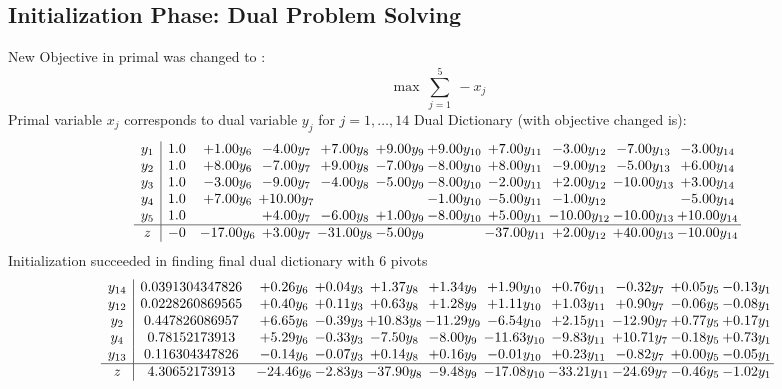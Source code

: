 \documentclass[9pt]{article}
\begin{document}
\subsection{Initialization Phase: Dual Problem Solving}
New Objective in primal was changed to : \[ \max\ \sum_{j=1}^{5}\ - x_j \] 
Primal variable $x_j$ corresponds to dual variable $y_j$ for $j = 1,\ldots,14$
Dual Dictionary (with objective changed is): 
\[\begin{array}{c| c c@{\hskip 2pt} c@{\hskip 2pt} c@{\hskip 2pt} c@{\hskip 2pt} c@{\hskip 2pt} c@{\hskip 2pt} c@{\hskip 2pt} c@{\hskip 2pt} c@{\hskip 2pt} }
 y_{1}   &  1.0 & +  1.00 y_{6} & -4.00 y_{7} & +  7.00 y_{8} & +  9.00 y_{9} & +  9.00 y_{10} & +  7.00 y_{11} & -3.00 y_{12} & -7.00 y_{13} & -3.00 y_{14}\\
 y_{2}   &  1.0 & +  8.00 y_{6} & -7.00 y_{7} & +  9.00 y_{8} & -7.00 y_{9} & -8.00 y_{10} & +  8.00 y_{11} & -9.00 y_{12} & -5.00 y_{13} & +  6.00 y_{14}\\
 y_{3}   &  1.0 & -3.00 y_{6} & -9.00 y_{7} & -4.00 y_{8} & -5.00 y_{9} & -8.00 y_{10} & -2.00 y_{11} & +  2.00 y_{12} & -10.00 y_{13} & +  3.00 y_{14}\\
 y_{4}   &  1.0 & +  7.00 y_{6} & + 10.00 y_{7} &    &   & -1.00 y_{10} & -5.00 y_{11} & -1.00 y_{12} &   & -5.00 y_{14}\\
 y_{5}   &  1.0  &   & +  4.00 y_{7} & -6.00 y_{8} & +  1.00 y_{9} & -8.00 y_{10} & +  5.00 y_{11} & -10.00 y_{12} & -10.00 y_{13} & + 10.00 y_{14}\\
\hline
z    &  -0 & -17.00 y_{6} & +  3.00 y_{7} & -31.00 y_{8} & -5.00 y_{9} &   & -37.00 y_{11} & +  2.00 y_{12} & + 40.00 y_{13} & -10.00 y_{14}\\
\end{array}\]
Initialization succeeded in finding final dual dictionary with 6 pivots
\[\begin{array}{c| c c@{\hskip 2pt} c@{\hskip 2pt} c@{\hskip 2pt} c@{\hskip 2pt} c@{\hskip 2pt} c@{\hskip 2pt} c@{\hskip 2pt} c@{\hskip 2pt} c@{\hskip 2pt} }
 y_{14}   &  0.0391304347826 & +  0.26 y_{6} & +  0.04 y_{3} & +  1.37 y_{8} & +  1.34 y_{9} & +  1.90 y_{10} & +  0.76 y_{11} & -0.32 y_{7} & +  0.05 y_{5} & -0.13 y_{1}\\
 y_{12}   &  0.0228260869565 & +  0.40 y_{6} & +  0.11 y_{3} & +  0.63 y_{8} & +  1.28 y_{9} & +  1.11 y_{10} & +  1.03 y_{11} & +  0.90 y_{7} & -0.06 y_{5} & -0.08 y_{1}\\
 y_{2}   &  0.447826086957 & +  6.65 y_{6} & -0.39 y_{3} & + 10.83 y_{8} & -11.29 y_{9} & -6.54 y_{10} & +  2.15 y_{11} & -12.90 y_{7} & +  0.77 y_{5} & +  0.17 y_{1}\\
 y_{4}   &  0.78152173913 & +  5.29 y_{6} & -0.33 y_{3} & -7.50 y_{8} & -8.00 y_{9} & -11.63 y_{10} & -9.83 y_{11} & + 10.71 y_{7} & -0.18 y_{5} & +  0.73 y_{1}\\
 y_{13}   &  0.116304347826 & -0.14 y_{6} & -0.07 y_{3} & +  0.14 y_{8} & +  0.16 y_{9} & -0.01 y_{10} & +  0.23 y_{11} & -0.82 y_{7} & +  0.00 y_{5} & -0.05 y_{1}\\
\hline
z    &  4.30652173913 & -24.46 y_{6} & -2.83 y_{3} & -37.90 y_{8} & -9.48 y_{9} & -17.08 y_{10} & -33.21 y_{11} & -24.69 y_{7} & -0.46 y_{5} & -1.02 y_{1}\\
\end{array}\]
\end{document}
